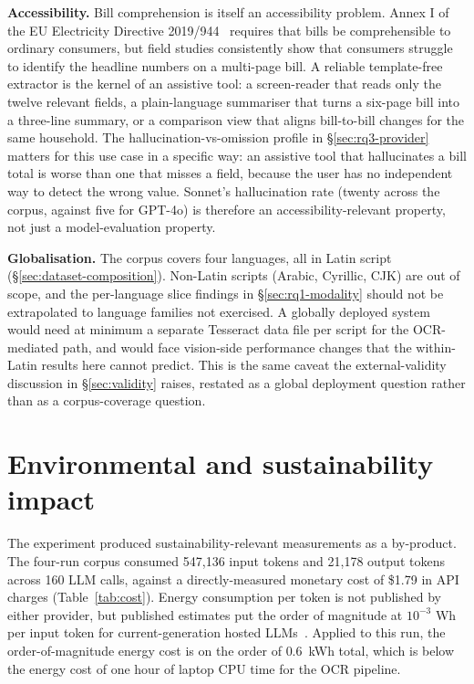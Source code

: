 \textbf{Accessibility.} Bill comprehension is itself an accessibility problem.
Annex I of the EU Electricity Directive 2019/944~\cite{eu_directive_2019_944_annexI}
requires that bills be comprehensible to ordinary consumers, but field studies
consistently show that consumers struggle to identify the headline numbers on a
multi-page bill. A reliable template-free extractor is the kernel of an
assistive tool: a screen-reader that reads only the twelve relevant fields, a
plain-language summariser that turns a six-page bill into a three-line summary,
or a comparison view that aligns bill-to-bill changes for the same household. The
hallucination-vs-omission profile in \S\ref{sec:rq3-provider} matters for this
use case in a specific way: an assistive tool that hallucinates a bill total is
worse than one that misses a field, because the user has no independent way to
detect the wrong value. Sonnet's hallucination rate (twenty across the corpus,
against five for GPT-4o) is therefore an accessibility-relevant property, not
just a model-evaluation property.

\textbf{Globalisation.} The corpus covers four languages, all in Latin script
(\S\ref{sec:dataset-composition}). Non-Latin scripts (Arabic, Cyrillic, CJK) are
out of scope, and the per-language slice findings in \S\ref{sec:rq1-modality}
should not be extrapolated to language families not exercised. A globally
deployed system would need at minimum a separate Tesseract data file per
script for the OCR-mediated path, and would face vision-side performance changes
that the within-Latin results here cannot predict. This is the same caveat the
external-validity discussion in \S\ref{sec:validity} raises, restated as a global
deployment question rather than as a corpus-coverage question.

\section{Environmental and sustainability impact}
\label{sec:lsesp-environment}

The experiment produced sustainability-relevant measurements as a by-product.
The four-run corpus consumed 547,136 input tokens and 21,178 output tokens across
160 LLM calls, against a directly-measured monetary cost of \$1.79 in API charges
(Table~\ref{tab:cost}). Energy consumption per token is not published by either
provider, but published estimates put the order of magnitude at $10^{-3}$ Wh per
input token for current-generation hosted LLMs~\cite{patterson2021carbon}.
Applied to this run, the order-of-magnitude energy cost is on the order of $0.6$~kWh
total, which is below the energy cost of one hour of laptop CPU time for the OCR
pipeline.

